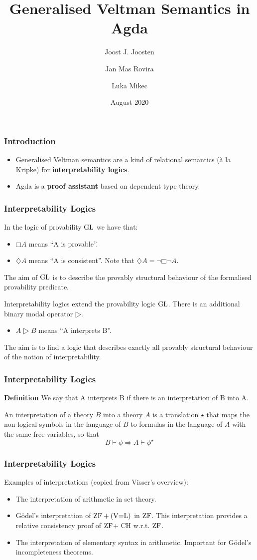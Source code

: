 \documentclass{beamer}
\title{Generalised Veltman Semantics in Agda}
\author{Joost J. Joosten\inst{1} \and Jan Mas Rovira\inst{1}\and Luka Mikec\inst{2}}
\institute[shortinst]{\inst{1} University of Barcelona \and %
  \inst{2} University of Zagreb}
\date{August 2020}
\newcommand{\gl}{\ensuremath{\textup{GL}}\xspace}
\newcommand{\zf}{\ensuremath{\textup{ZF}}\xspace}
\newcommand{\veql}{\ensuremath{\textup{(V=L)}}\xspace}
\begin{document}
\frame{\titlepage}

\begin{frame}
  \frametitle{Introduction}
  \begin{itemize}
  \item Generalised Veltman semantics are a kind of relational semantics (à la
    Kripke) for \textbf{interpretability logics}. \break \pause
    \item Agda is a \textbf{proof assistant} based on dependent type theory.
  \end{itemize}
\end{frame}

\begin{frame}
  \frametitle{Interpretability Logics}
  In the logic of provability \gl we have that:
  \begin{itemize}
    \item $□A$ means ``A is provable''.
    \item $♢A$ means ``A is consistent''. Note that $♢A=¬□¬A$.
  \end{itemize}
  The aim of \gl is to describe the provably structural behaviour of the
  formalised provability predicate.

  \pause \vspace{0.5cm}

  Interpretability logics extend the provability logic \gl. There is an
  additional binary modal operator $▷$.
  \begin{itemize}
  \item $A▷B$ means ``A interprets B''.
  \end{itemize}
  The aim is to find a logic that describes exactly all provably structural
  behaviour of the notion of interpretability.
\end{frame}

\begin{frame}
  \frametitle{Interpretability Logics}
  \textbf{Definition}
  We say that A interprets B if there is an interpretation of B into A.

  An interpretation of a theory $B$ into a theory $A$ is a translation $⋆$ that
  maps the non-logical symbols in the language of $B$ to formulas in the
  language of $A$ with the same free variables, so that
  \[B⊢ϕ⇒ A⊢ϕ^⋆\]
\end{frame}

\begin{frame}
  \frametitle{Interpretability Logics}
  Examples of interpretations (copied from Visser's overview):
  \begin{itemize}
  \item The interpretation of arithmetic in set theory.
    \pause
  \item Gödel's interpretation of $\zf+\veql$ in \zf. This interpretation
    provides a relative consistency proof of \zf + CH w.r.t. \zf.
    \pause
  \item The interpretation of elementary syntax in arithmetic. Important for
    Gödel's incompleteness theorems.
  \end{itemize}

\end{frame}
\end{document}
